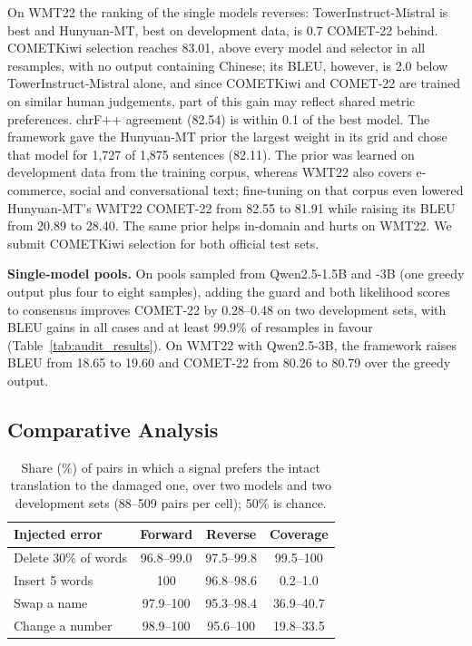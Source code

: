 \documentclass[11pt]{article}
\begin{document}
On WMT22 the ranking of the single models reverses: TowerInstruct-Mistral is best and Hunyuan-MT, best on development data, is 0.7 COMET-22 behind. COMETKiwi selection reaches 83.01, above every model and selector in all resamples, with no output containing Chinese; its BLEU, however, is 2.0 below TowerInstruct-Mistral alone, and since COMETKiwi and COMET-22 are trained on similar human judgements, part of this gain may reflect shared metric preferences. chrF++ agreement (82.54) is within 0.1 of the best model. The framework gave the Hunyuan-MT prior the largest weight in its grid and chose that model for 1,727 of 1,875 sentences (82.11). The prior was learned on development data from the training corpus, whereas WMT22 also covers e-commerce, social and conversational text; fine-tuning on that corpus even lowered Hunyuan-MT's WMT22 COMET-22 from 82.55 to 81.91 while raising its BLEU from 20.89 to 28.40. The same prior helps in-domain and hurts on WMT22. We submit COMETKiwi selection for both official test sets.

\textbf{Single-model pools.} On pools sampled from Qwen2.5-1.5B and -3B (one greedy output plus four to eight samples), adding the guard and both likelihood scores to consensus improves COMET-22 by 0.28--0.48 on two development sets, with BLEU gains in all cases and at least 99.9\% of resamples in favour (Table~\ref{tab:audit_results}). On WMT22 with Qwen2.5-3B, the framework raises BLEU from 18.65 to 19.60 and COMET-22 from 80.26 to 80.79 over the greedy output.

\subsection{Comparative Analysis}
\label{subsec:comparative_analysis}

\begin{table}[t]
\centering
\small
\begin{tabular}{lccc}
\toprule
Injected error & Forward & Reverse & Coverage \\
\midrule
Delete 30\% of words  & 96.8--99.0 & 97.5--99.8 & 99.5--100 \\
Insert 5 words        & 100        & 96.8--98.6 & 0.2--1.0 \\
Swap a name           & 97.9--100  & 95.3--98.4 & 36.9--40.7 \\
Change a number       & 98.9--100  & 95.6--100  & 19.8--33.5 \\
\bottomrule
\end{tabular}
\caption{Share (\%) of pairs in which a signal prefers the intact translation to the damaged one, over two models and two development sets (88--509 pairs per cell); 50\% is chance.}
\label{tab:error_matrix}
\end{table}
\end{document}
